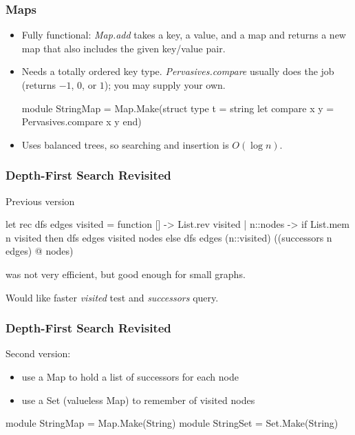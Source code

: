 \documentclass{plt}
\begin{document}
\begin{frame}[fragile]
  \frametitle{Maps}

\begin{itemize}
\item Fully functional: \emph{Map.add} takes a key, a value, and a map
  and returns a new map that also includes the given key/value pair.

\item Needs a totally ordered key type. \emph{Pervasives.compare}
  usually does the job (returns $-1$, $0$, or $1$); you may
  supply your own.

\begin{minipage}{0.7\textwidth}
\begin{ocaml}
module StringMap = Map.Make(struct
  type t = string
  let compare x y = Pervasives.compare x y
end)
\end{ocaml}
\end{minipage}

\item Uses balanced trees, so searching and insertion is $O(\log n)$.

\end{itemize}

\end{frame}

\begin{frame}[fragile]
  \frametitle{Depth-First Search Revisited}

Previous version

\begin{ocaml}
let rec dfs edges visited = function
  []       -> List.rev visited
| n::nodes ->
  if List.mem n visited then
    dfs edges visited nodes
  else
    dfs edges (n::visited) ((successors n edges) @ nodes)
\end{ocaml}

was not very efficient, but good enough for small graphs.

Would like faster \emph{visited} test and \emph{successors} query.

\end{frame}

\begin{frame}[fragile]
  \frametitle{Depth-First Search Revisited}

Second version:

\begin{itemize}
\item use a Map to hold a list of successors for each node
\item use a Set (valueless Map) to remember of visited nodes
\end{itemize}

\begin{ocaml}
module StringMap = Map.Make(String)
module StringSet = Set.Make(String)
\end{ocaml}

\end{frame}
\end{document}
